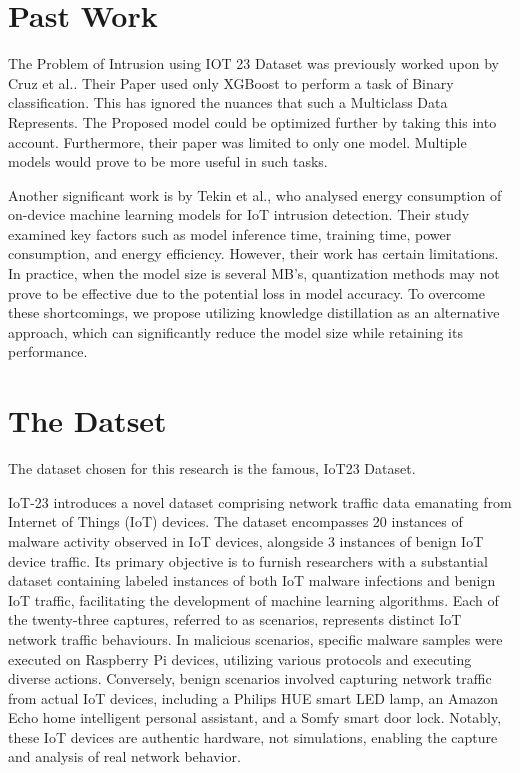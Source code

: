 \documentclass[conference,letterpaper]{IEEEtran}
\begin{document}
\section{Past Work}
 The Problem of Intrusion using IOT 23 Dataset was previously worked upon by Cruz et al.\cite{9831021}.
Their Paper used only XGBoost to perform a task of Binary classification. This has ignored the nuances that such a Multiclass Data Represents. The Proposed model could be optimized further by taking this into account. Furthermore, their paper was limited to only one model. Multiple models would prove to be more useful in such tasks. 

Another significant work is by Tekin et al.\cite{basepaper2}, who analysed energy consumption of on-device machine learning models for IoT intrusion detection. Their study examined key factors such as model inference time, training time, power consumption, and energy efficiency. However, their work has certain limitations. In practice, when the model size is several MB's, quantization methods may not prove to be effective due to the potential loss in model accuracy. To overcome these shortcomings, we propose utilizing knowledge distillation as an alternative approach, which can significantly reduce the model size while retaining its performance.




\section{The Datset}

The dataset chosen for this research is the famous, IoT23 Dataset.

IoT-23 introduces a novel dataset comprising network traffic data emanating from Internet of Things (IoT) devices. The dataset encompasses 20 instances of malware activity observed in IoT devices, alongside 3 instances of benign IoT device traffic. Its primary objective is to furnish researchers with a substantial dataset containing labeled instances of both IoT malware infections and benign IoT traffic, facilitating the development of machine learning algorithms. Each of the twenty-three captures, referred to as scenarios, represents distinct IoT network traffic behaviours. In malicious scenarios, specific malware samples were executed on Raspberry Pi devices, utilizing various protocols and executing diverse actions. Conversely, benign scenarios involved capturing network traffic from actual IoT devices, including a Philips HUE smart LED lamp, an Amazon Echo home intelligent personal assistant, and a Somfy smart door lock. Notably, these IoT devices are authentic hardware, not simulations, enabling the capture and analysis of real network behavior.
\end{document}
